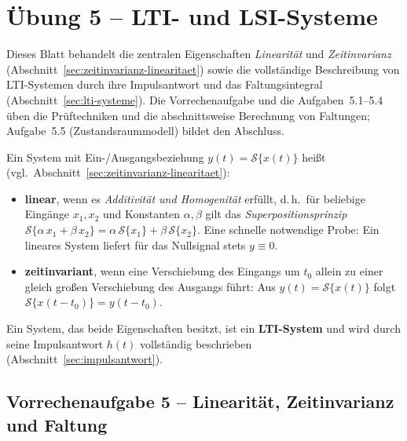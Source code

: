 \section{Übung 5 – LTI- und LSI-Systeme}

Dieses Blatt behandelt die zentralen Eigenschaften \emph{Linearität} und
\emph{Zeitinvarianz} (Abschnitt~\ref{sec:zeitinvarianz-linearitaet}) sowie die
vollständige Beschreibung von LTI-Systemen durch ihre Impulsantwort und das
Faltungsintegral (Abschnitt~\ref{sec:lti-systeme}). Die Vorrechenaufgabe und die
Aufgaben~5.1--5.4 üben die Prüftechniken und die abschnittsweise Berechnung von
Faltungen; Aufgabe~5.5 (Zustandsraummodell) bildet den Abschluss.

\begin{bemerkung}

Ein System mit Ein-/Ausgangsbeziehung $y(t) = \mathcal{S}\{x(t)\}$ heißt
(vgl.\ Abschnitt~\ref{sec:zeitinvarianz-linearitaet}):

\begin{itemize}
  \item \textbf{linear}, wenn es \emph{Additivität und Homogenität} erfüllt,
        d.\,h.\ für beliebige Eingänge $x_1, x_2$ und Konstanten $\alpha,\beta$
        gilt das \emph{Superpositionsprinzip}
        $\mathcal{S}\{\alpha\, x_1 + \beta\, x_2\} = \alpha\,\mathcal{S}\{x_1\} + \beta\,\mathcal{S}\{x_2\}$.
        Eine schnelle notwendige Probe: Ein lineares System liefert für das
        Nullsignal stets $y \equiv 0$.
  \item \textbf{zeitinvariant}, wenn eine Verschiebung des Eingangs um $t_0$
        allein zu einer gleich großen Verschiebung des Ausgangs führt:
        Aus $y(t) = \mathcal{S}\{x(t)\}$ folgt
        $\mathcal{S}\{x(t - t_0)\} = y(t - t_0)$.
\end{itemize}

Ein System, das beide Eigenschaften besitzt, ist ein \textbf{LTI-System} und
wird durch seine Impulsantwort $h(t)$ vollständig beschrieben
(Abschnitt~\ref{sec:impulsantwort}).

\end{bemerkung}

\subsection*{Vorrechenaufgabe 5 – Linearität, Zeitinvarianz und Faltung}

